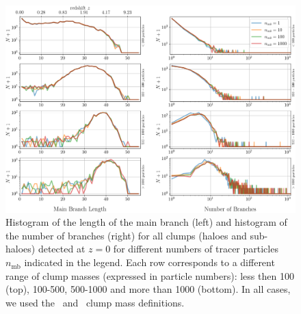 



\begin{figure}
  \centering
  \includegraphics[width=\textwidth, keepaspectratio]
	{figures/ACACIA/tree-statistics-my-threshold/tree_geometry-ntrace.png}%
  \caption{ Histogram of the length of the main branch (left) and
    histogram of the number of branches (right) for all clumps (haloes
    and sub-haloes) detected at $z=0$ for different numbers of tracer
    particles $n_{\mathrm{mb}}$ indicated in the legend.  Each row
    corresponds to a different range of clump masses (expressed in
    particle numbers): less then 100 (top), 100-500, 500-1000 and more
    than 1000 (bottom).  In all cases, we used the \exc\ and
    \sad\ clump mass definitions.
  }%
  \label{fig:ntracers_mbl_nbranch}
\end{figure}


